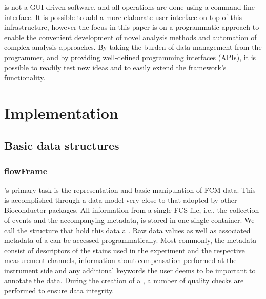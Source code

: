 \documentclass[10pt]{bmc_article}
\newenvironment{bmcformat}{\begin{raggedright}\baselineskip20pt\sloppy\setboolean{publ}{false}}{\end{raggedright}\baselineskip20pt\sloppy}
\begin{document}
\begin{bmcformat}
 is not a GUI-driven software, and all operations
are done using a command line interface.  It is possible to add a more
elaborate user interface on top of this infrastructure, however the
focus in this paper is on a programmatic approach to enable the
convenient development of novel analysis methods and automation of
complex analysis approaches.  By taking the burden of data management
from the programmer, and by providing well-defined programming
interfaces (APIs), it is possible to readily test new ideas and to
easily extend the framework's functionality.

\section*{Implementation}
 \subsection*{Basic data structures}
\subsubsection*{flowFrame}

's primary task is the representation and basic
manipulation of FCM data. This is accomplished through a data model
very close to that adopted by other Bioconductor packages. All
information from a single FCS file, i.e., the collection of events and
the accompanying metadata, is stored in one single container. We call
the structure that hold this data a . Raw data
values as well as associated metadata of a  can be
accessed programmatically. Most commonly, the metadata consist of
descriptors of the stains used in the experiment and the respective
measurement channels, information about compensation performed at the
instrument side and any additional keywords the user deems to be
important to annotate the data. During the creation of a
, a number of quality checks are performed to ensure
data integrity.


\end{bmcformat}
\end{document}
